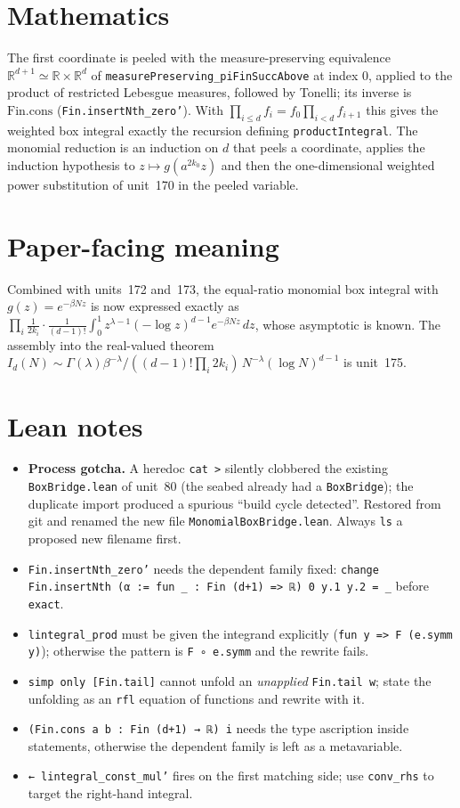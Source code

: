 \documentclass[11pt]{article}
\begin{document}
\section{Mathematics}
The first coordinate is peeled with the measure-preserving equivalence
$\mathbb R^{d+1}\simeq\mathbb R\times\mathbb R^d$ of \texttt{measurePreserving\_piFinSuccAbove}
at index $0$, applied to the product of restricted Lebesgue measures, followed by Tonelli; its
inverse is $\mathrm{Fin.cons}$ (\texttt{Fin.insertNth\_zero'}). With
$\prod_{i\le d}f_i=f_0\prod_{i<d}f_{i+1}$ this gives the weighted box integral exactly the
recursion defining \texttt{productIntegral}. The monomial reduction is an induction on $d$ that
peels a coordinate, applies the induction hypothesis to $z\mapsto g(a^{2k_0}z)$ and then the
one-dimensional weighted power substitution of unit~170 in the peeled variable.

\section{Paper-facing meaning}
Combined with units~172 and~173, the equal-ratio monomial box integral with
$g(z)=e^{-\beta Nz}$ is now expressed exactly as
$\prod_i\frac1{2k_i}\cdot\frac1{(d-1)!}\int_0^1z^{\lambda-1}(-\log z)^{d-1}e^{-\beta Nz}\,dz$,
whose asymptotic is known. The assembly into the real-valued theorem
$I_d(N)\sim\Gamma(\lambda)\beta^{-\lambda}/((d-1)!\prod_i2k_i)\,N^{-\lambda}(\log N)^{d-1}$ is
unit~175.

\section{Lean notes}
\begin{itemize}
\item \textbf{Process gotcha.} A heredoc \texttt{cat >} silently clobbered the existing
\texttt{BoxBridge.lean} of unit~80 (the seabed already had a \texttt{BoxBridge}); the duplicate
import produced a spurious ``build cycle detected''. Restored from git and renamed the new file
\texttt{MonomialBoxBridge.lean}. Always \texttt{ls} a proposed new filename first.
\item \texttt{Fin.insertNth\_zero'} needs the dependent family fixed:
\texttt{change Fin.insertNth (α := fun \_ : Fin (d+1) => ℝ) 0 y.1 y.2 = \_} before \texttt{exact}.
\item \texttt{lintegral\_prod} must be given the integrand explicitly
(\texttt{fun y => F (e.symm y)}); otherwise the pattern is \texttt{F ∘ e.symm} and the rewrite fails.
\item \texttt{simp only [Fin.tail]} cannot unfold an \emph{unapplied} \texttt{Fin.tail w};
state the unfolding as an \texttt{rfl} equation of functions and rewrite with it.
\item \texttt{(Fin.cons a b : Fin (d+1) → ℝ) i} needs the type ascription inside statements,
otherwise the dependent family is left as a metavariable.
\item \texttt{← lintegral\_const\_mul'} fires on the first matching side; use
\texttt{conv\_rhs} to target the right-hand integral.
\end{itemize}
\end{document}
